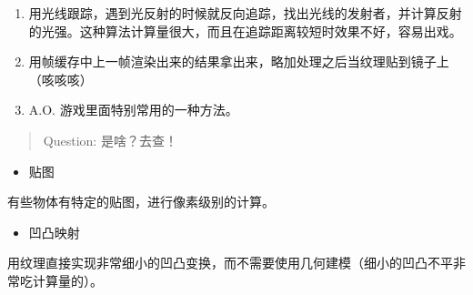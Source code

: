 \documentclass[
]{article}
\begin{document}
\begin{enumerate}
\def\labelenumi{\arabic{enumi}.}
\item
  用光线跟踪，遇到光反射的时候就反向追踪，找出光线的发射者，并计算反射的光强。这种算法计算量很大，而且在追踪距离较短时效果不好，容易出戏。
\item
  用帧缓存中上一帧渲染出来的结果拿出来，略加处理之后当纹理贴到镜子上（咳咳咳）
\item
  A.O. 游戏里面特别常用的一种方法。
\end{enumerate}

\begin{quote}
Question: 是啥？去查！
\end{quote}

\begin{itemize}
\item
  贴图
\end{itemize}

有些物体有特定的贴图，进行像素级别的计算。

\begin{itemize}
\item
  凹凸映射
\end{itemize}

用纹理直接实现非常细小的凹凸变换，而不需要使用几何建模（细小的凹凸不平非常吃计算量的）。
\end{document}
